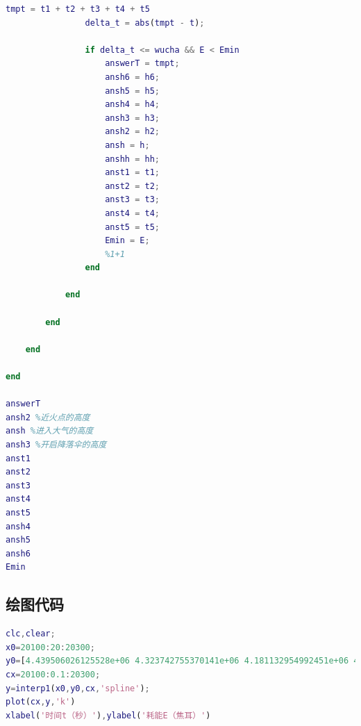 \documentclass[hyperref,a4paper,UTF8]{ctexart}
\begin{document}
\begin{lstlisting}[language=Matlab]
                tmpt = t1 + t2 + t3 + t4 + t5
                delta_t = abs(tmpt - t);

                if delta_t <= wucha && E < Emin
                    answerT = tmpt;
                    ansh6 = h6;
                    ansh5 = h5;
                    ansh4 = h4;
                    ansh3 = h3;
                    ansh2 = h2;
                    ansh = h;
                    anshh = hh;
                    anst1 = t1;
                    anst2 = t2;
                    anst3 = t3;
                    anst4 = t4;
                    anst5 = t5;
                    Emin = E;
                    %1+1
                end

            end

        end

    end

end

answerT
ansh2 %近火点的高度
ansh %进入大气的高度
ansh3 %开启降落伞的高度
anst1
anst2
anst3
anst4
anst5
ansh4
ansh5
ansh6
Emin    
\end{lstlisting}
\subsection{绘图代码}
\begin{lstlisting}[language=Matlab]
clc,clear;
x0=20100:20:20300;
y0=[4.439506026125528e+06 4.323742755370141e+06 4.181132954992451e+06 4.089111711446583e+06 3.999406693658655e+06 3.963666765054225e+06 3.959624858401800e+06 3.959624858401800e+06 3.959624858401800e+06 3.959624858401800e+06 3.959624858401800e+06]
cx=20100:0.1:20300;
y=interp1(x0,y0,cx,'spline');
plot(cx,y,'k')
xlabel('时间t（秒）'),ylabel('耗能E（焦耳）')
\end{lstlisting}
\end{document}
